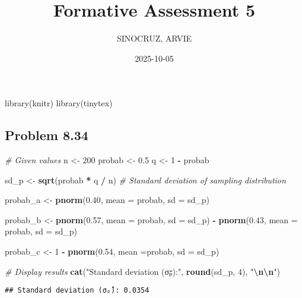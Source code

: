 \documentclass[
]{article}
\title{Formative Assessment 5}
\author{SINOCRUZ, ARVIE}
\date{2025-10-05}
\newenvironment{Shaded}{\begin{snugshade}}{\end{snugshade}}
\newcommand{\AttributeTok}[1]{\textcolor[rgb]{0.13,0.29,0.53}{#1}}
\newcommand{\CommentTok}[1]{\textcolor[rgb]{0.56,0.35,0.01}{\textit{#1}}}
\newcommand{\DecValTok}[1]{\textcolor[rgb]{0.00,0.00,0.81}{#1}}
\newcommand{\FloatTok}[1]{\textcolor[rgb]{0.00,0.00,0.81}{#1}}
\newcommand{\FunctionTok}[1]{\textcolor[rgb]{0.13,0.29,0.53}{\textbf{#1}}}
\newcommand{\NormalTok}[1]{#1}
\newcommand{\OtherTok}[1]{\textcolor[rgb]{0.56,0.35,0.01}{#1}}
\newcommand{\SpecialCharTok}[1]{\textcolor[rgb]{0.81,0.36,0.00}{\textbf{#1}}}
\newcommand{\StringTok}[1]{\textcolor[rgb]{0.31,0.60,0.02}{#1}}
\begin{document}
\maketitle

library(knitr) library(tinytex)

\subsection{Problem 8.34}\label{problem-8.34}

\begin{Shaded}
\begin{Highlighting}[]
\CommentTok{\# Given values}
\NormalTok{n }\OtherTok{\textless{}{-}} \DecValTok{200}
\NormalTok{probab }\OtherTok{\textless{}{-}} \FloatTok{0.5}
\NormalTok{q }\OtherTok{\textless{}{-}} \DecValTok{1} \SpecialCharTok{{-}}\NormalTok{ probab}

\NormalTok{sd\_p }\OtherTok{\textless{}{-}} \FunctionTok{sqrt}\NormalTok{(probab }\SpecialCharTok{*}\NormalTok{ q }\SpecialCharTok{/}\NormalTok{ n)  }\CommentTok{\# Standard deviation of sampling distribution}

\NormalTok{probab\_a }\OtherTok{\textless{}{-}} \FunctionTok{pnorm}\NormalTok{(}\FloatTok{0.40}\NormalTok{, }\AttributeTok{mean =}\NormalTok{ probab, }\AttributeTok{sd =}\NormalTok{ sd\_p)}

\NormalTok{probab\_b }\OtherTok{\textless{}{-}} \FunctionTok{pnorm}\NormalTok{(}\FloatTok{0.57}\NormalTok{, }\AttributeTok{mean =}\NormalTok{ probab, }\AttributeTok{sd =}\NormalTok{ sd\_p) }\SpecialCharTok{{-}} \FunctionTok{pnorm}\NormalTok{(}\FloatTok{0.43}\NormalTok{, }\AttributeTok{mean =}\NormalTok{ probab, }\AttributeTok{sd =}\NormalTok{ sd\_p)}

\NormalTok{probab\_c }\OtherTok{\textless{}{-}} \DecValTok{1} \SpecialCharTok{{-}} \FunctionTok{pnorm}\NormalTok{(}\FloatTok{0.54}\NormalTok{, }\AttributeTok{mean =}\NormalTok{probab, }\AttributeTok{sd =}\NormalTok{ sd\_p)}

\CommentTok{\# Display results}
\FunctionTok{cat}\NormalTok{(}\StringTok{"Standard deviation (σₚ̂):"}\NormalTok{, }\FunctionTok{round}\NormalTok{(sd\_p, }\DecValTok{4}\NormalTok{), }\StringTok{"}\SpecialCharTok{\textbackslash{}n\textbackslash{}n}\StringTok{"}\NormalTok{)}
\end{Highlighting}
\end{Shaded}

\begin{verbatim}
## Standard deviation (σₚ̂): 0.0354
\end{verbatim}
\end{document}
